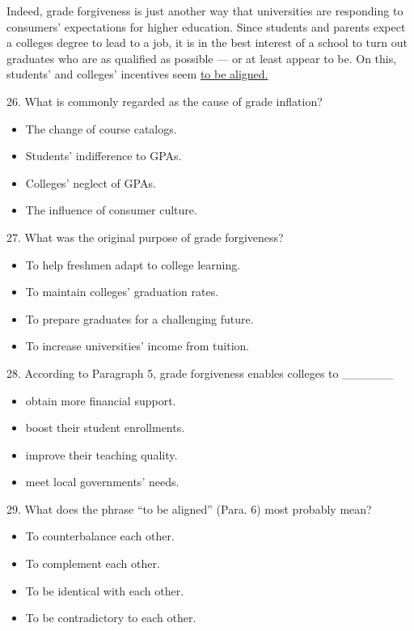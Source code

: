 \documentclass[UTF8,11pt]{ctexart}
\begin{document}
Indeed, grade forgiveness is just another way that universities are responding to consumers’ expectations for higher education. Since students and parents expect a colleges degree to lead to a job, it is in the best interest of a school to turn out graduates who are as qualified as possible — or at least appear to be. On this, students’ and colleges’ incentives seem \uline{to be aligned.}


26. What is commonly regarded as the cause of grade inflation?


\begin{itemize}[leftmargin=2em,itemsep=.2em,topsep=.4em]\item[A.] The change of course catalogs.
\item[B.] Students’ indifference to GPAs.
\item[C.] Colleges’ neglect of GPAs.
\item[D.] The influence of consumer culture.
\end{itemize}

27. What was the original purpose of grade forgiveness?


\begin{itemize}[leftmargin=2em,itemsep=.2em,topsep=.4em]\item[A.] To help freshmen adapt to college learning.
\item[B.] To maintain colleges’ graduation rates.
\item[C.] To prepare graduates for a challenging future.
\item[D.] To increase universities’ income from tuition.
\end{itemize}

28. According to Paragraph 5, grade forgiveness enables colleges to \_\_\_\_\_\_


\begin{itemize}[leftmargin=2em,itemsep=.2em,topsep=.4em]\item[A.] obtain more financial support.
\item[B.] boost their student enrollments.
\item[C.] improve their teaching quality.
\item[D.] meet local governments’ needs.
\end{itemize}

29. What does the phrase “to be aligned” (Para. 6) most probably mean?


\begin{itemize}[leftmargin=2em,itemsep=.2em,topsep=.4em]\item[A.] To counterbalance each other.
\item[B.] To complement each other.
\item[C.] To be identical with each other.
\item[D.] To be contradictory to each other.
\end{itemize}
\end{document}
